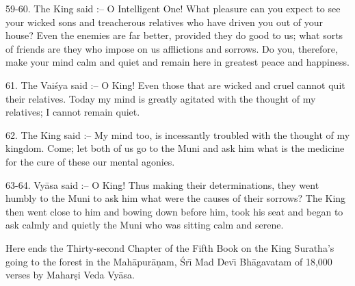 59-60. The King said :-- O Intelligent One! What pleasure can you expect to see your wicked sons and treacherous relatives who have driven you out of your house? Even the enemies are far better, provided they do good to us; what sorts of friends are they who impose on us afflictions and sorrows. Do you, therefore, make your mind calm and quiet and remain here in greatest peace and happiness.

61. The Vai\'sya said :-- O King! Even those that are wicked and cruel cannot quit their relatives. Today my mind is greatly agitated with the thought of my relatives; I cannot remain quiet.

62. The King said :-- My mind too, is incessantly troubled with the thought of my kingdom. Come; let both of us go to the Muni and ask him what is the medicine for the cure of these our mental agonies.

63-64. Vy\=asa said :-- O King! Thus making their determinations, they went humbly to the Muni to ask him what were the causes of their sorrows? The King then went close to him and bowing down before him, took his seat and began to ask calmly and quietly the Muni who was sitting calm and serene.

Here ends the Thirty-second Chapter of the Fifth Book on the King Suratha's going to the forest in the Mah\=apur\=a\d{n}am, \'Sr\={\i} Mad Dev\={\i} Bh\=agavatam of 18,000 verses by Mahar\d{s}i Veda Vy\=asa.



